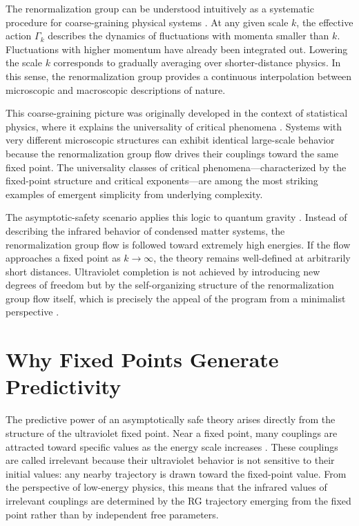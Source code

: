 \documentclass[12pt,a4paper]{article}
\begin{document}
The renormalization group can be understood intuitively as a systematic
procedure for coarse-graining physical systems \cite{WilsonKogut1974,Kadanoff1966,
Goldenfeld1992}. At any given scale $k$, the effective action $\Gamma_k$
describes the dynamics of fluctuations with momenta smaller than $k$.
Fluctuations with higher momentum have already been integrated out. Lowering
the scale $k$ corresponds to gradually averaging over shorter-distance physics.
In this sense, the renormalization group provides a continuous interpolation
between microscopic and macroscopic descriptions of nature.

This coarse-graining picture was originally developed in the context of
statistical physics, where it explains the universality of critical phenomena
\cite{Wilson1971,Kadanoff1966,Stanley1971,Cardy1996}. Systems with very
different microscopic structures can exhibit identical large-scale behavior
because the renormalization group flow drives their couplings toward the same
fixed point. The universality classes of critical phenomena---characterized by
the fixed-point structure and critical exponents---are among the most striking
examples of emergent simplicity from underlying complexity.

The asymptotic-safety scenario applies this logic to quantum gravity
\cite{Weinberg1979,Reuter1998}. Instead of describing the infrared behavior of
condensed matter systems, the renormalization group flow is followed toward
extremely high energies. If the flow approaches a fixed point as
$k \to \infty$, the theory remains well-defined at arbitrarily short distances.
Ultraviolet completion is not achieved by introducing new degrees of freedom
but by the self-organizing structure of the renormalization group flow itself,
which is precisely the appeal of the program from a minimalist perspective
\cite{Eichhorn2019,Percacci2017}.

\section{Why Fixed Points Generate Predictivity}

The predictive power of an asymptotically safe theory arises directly from the
structure of the ultraviolet fixed point. Near a fixed point, many couplings
are attracted toward specific values as the energy scale increases
\cite{WilsonKogut1974,Berges2002}. These couplings are called irrelevant because
their ultraviolet behavior is not sensitive to their initial values: any nearby
trajectory is drawn toward the fixed-point value. From the perspective of
low-energy physics, this means that the infrared values of irrelevant couplings
are determined by the RG trajectory emerging from the fixed point rather than
by independent free parameters.
\end{document}
